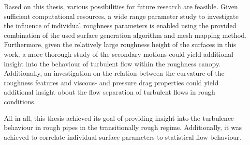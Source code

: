 Based on this thesis, various possibilities for future research are feasible.
Given sufficient computational resources, a wide range parameter study to investigate the influence of individual roughness parameters is enabled using the provided combination of the used surface generation algorithm and mesh mapping method.
Furthermore, given the relatively large roughness height of the surfaces in this work, a more thorough study of the secondary motions could yield additional insight into the behaviour of turbulent flow within the roughness canopy.
Additionally, an investigation on the relation between the curvature of the roughness features and viscous- and pressure drag properties could yield additional insight about the flow separation of turbulent flows in rough conditions.

All in all, this thesis achieved its goal of providing insight into the turbulence behaviour in rough pipes in the transitionally rough regime. Additionally, it was achieved to correlate individual surface parameters to statistical flow behaviour.
